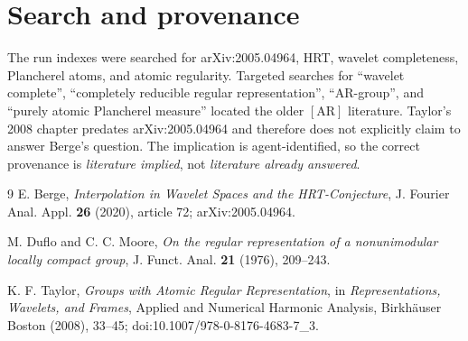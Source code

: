 \documentclass[11pt]{article}
\begin{document}
\section*{Search and provenance}

The run indexes were searched for arXiv:2005.04964, HRT, wavelet completeness,
Plancherel atoms, and atomic regularity. Targeted searches for ``wavelet
complete'', ``completely reducible regular representation'', ``AR-group'', and
``purely atomic Plancherel measure'' located the older $[\mathrm{AR}]$
literature. Taylor's 2008 chapter predates arXiv:2005.04964 and therefore does
not explicitly claim to answer Berge's question. The implication is
agent-identified, so the correct provenance is \emph{literature implied}, not
\emph{literature already answered}.

\begin{thebibliography}{9}
E. Berge,
\emph{Interpolation in Wavelet Spaces and the HRT-Conjecture},
J. Fourier Anal. Appl. \textbf{26} (2020), article 72;
arXiv:2005.04964.

M. Duflo and C. C. Moore,
\emph{On the regular representation of a nonunimodular locally compact
group}, J. Funct. Anal. \textbf{21} (1976), 209--243.

K. F. Taylor,
\emph{Groups with Atomic Regular Representation}, in
\emph{Representations, Wavelets, and Frames}, Applied and Numerical Harmonic
Analysis, Birkh\"auser Boston (2008), 33--45;
doi:10.1007/978-0-8176-4683-7\_3.
\end{thebibliography}
\end{document}
